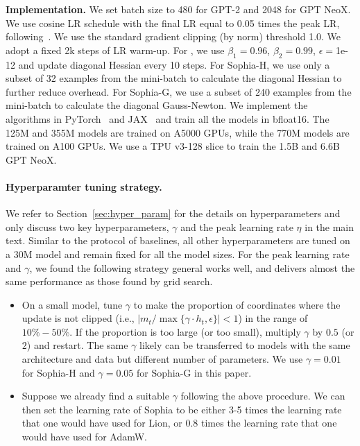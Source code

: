 \textbf{Implementation.} We set batch size to 480 for GPT-2 and 2048 for GPT NeoX. We use cosine LR schedule with the final LR equal to 0.05 times the peak LR,  following~\citet{rae2021scaling}. We use the standard gradient clipping (by norm) threshold 1.0. We adopt a fixed 2k steps of LR warm-up. For \ours, we use $\beta_1 = 0.96$, $\beta_2 = 0.99$, $\epsilon=$1e-12 and update diagonal Hessian every 10 steps. For Sophia-H, we use only a subset of 32 examples from the mini-batch to calculate the diagonal Hessian to further reduce overhead. For Sophia-G, we use a subset of 240 examples from the mini-batch to calculate the diagonal Gauss-Newton. We implement the algorithms in PyTorch~\citep{pytorch2019} and JAX~\citep{jax2018github} and train all the models in bfloat16. The 125M and 355M models are trained on A5000 GPUs, while the 770M models are trained on A100 GPUs. We use a TPU v3-128 slice to train the 1.5B and 6.6B GPT NeoX.


\paragraph{Hyperparamter tuning strategy.} We refer to Section~\ref{sec:hyper_param} for the details on hyperparameters and only discuss two key hyperparameters, $\gamma$ and the peak learning rate $\eta$ in the main text. Similar to the protocol of baselines, all other hyperparameters are tuned on a 30M model and remain fixed for all the model sizes. For the peak learning rate and $\gamma$, we found the following strategy general works well, and delivers almost the same performance as those found by grid search. 
\begin{itemize}
    \item On a small model, tune $\gamma$ to make the proportion of coordinates where the update is not clipped (i.e., $|m_t / \max\{\gamma \cdot h_t,\epsilon\}| < 1$) in the range of $10\%-50\%$. If the proportion is too large (or too small), multiply $\gamma$ by $0.5$ (or $2$) and restart. The same $\gamma$ likely can be transferred to models with the same architecture and data but different number of parameters. We use $\gamma = 0.01$ for Sophia-H and $\gamma=0.05$ for Sophia-G in this paper.
    \item Suppose we already find a suitable $\gamma$ following the above procedure. We can then set the learning rate of Sophia to be either 3-5 times the learning rate that one would have used for Lion, or 0.8 times the learning rate that one would have used for AdamW. 
\end{itemize}


